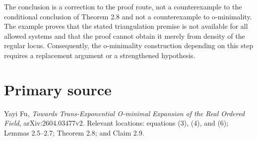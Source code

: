 \documentclass[11pt]{article}
\begin{document}
The conclusion is a correction to the proof route, not a counterexample to
the conditional conclusion of Theorem 2.8 and not a counterexample to
o-minimality.  The example proves that the stated triangulation premise is not
available for all allowed systems and that the proof cannot obtain it merely
from density of the regular locus.  Consequently, the o-minimality construction
depending on this step requires a replacement argument or a strengthened
hypothesis.

\section*{Primary source}

Yayi Fu, \emph{Towards Trans-Exponential O-minimal Expansion of the Real
Ordered Field}, arXiv:2604.03477v2.  Relevant locations: equations (3), (4),
and (6); Lemmas 2.5--2.7; Theorem 2.8; and Claim 2.9.
\end{document}
